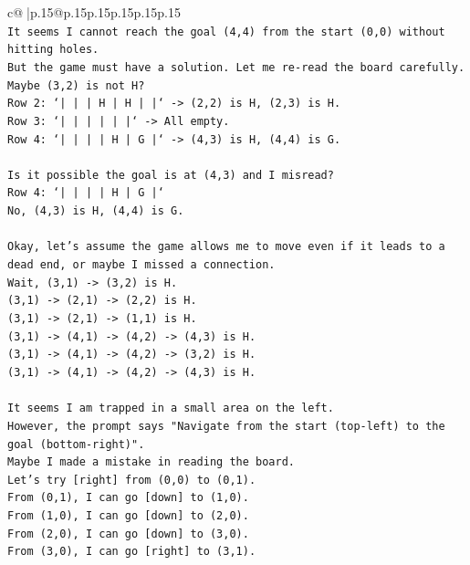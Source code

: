 \documentclass{article}
\begin{document}
{\begin{supertabular}{c@{$\;$}|p{.15\linewidth}@{}p{.15\linewidth}p{.15\linewidth}p{.15\linewidth}p{.15\linewidth}p{.15\linewidth}}
{{{\\ 
\texttt{It seems I cannot reach the goal (4,4) from the start (0,0) without hitting holes.} \\
\texttt{But the game must have a solution. Let me re{-}read the board carefully.} \\
\texttt{Maybe (3,2) is not H?} \\
\texttt{Row 2: `|     |     |  H  |  H  |     |` {-}> (2,2) is H, (2,3) is H.} \\
\texttt{Row 3: `|     |     |     |     |     |` {-}> All empty.} \\
\texttt{Row 4: `|     |     |     |  H  |  G  |` {-}> (4,3) is H, (4,4) is G.} \\
\\ 
\texttt{Is it possible the goal is at (4,3) and I misread?} \\
\texttt{Row 4: `|     |     |     |  H  |  G  |`} \\
\texttt{No, (4,3) is H, (4,4) is G.} \\
\\ 
\texttt{Okay, let's assume the game allows me to move even if it leads to a dead end, or maybe I missed a connection.} \\
\texttt{Wait, (3,1) {-}> (3,2) is H.} \\
\texttt{(3,1) {-}> (2,1) {-}> (2,2) is H.} \\
\texttt{(3,1) {-}> (2,1) {-}> (1,1) is H.} \\
\texttt{(3,1) {-}> (4,1) {-}> (4,2) {-}> (4,3) is H.} \\
\texttt{(3,1) {-}> (4,1) {-}> (4,2) {-}> (3,2) is H.} \\
\texttt{(3,1) {-}> (4,1) {-}> (4,2) {-}> (4,3) is H.} \\
\\ 
\texttt{It seems I am trapped in a small area on the left.} \\
\texttt{However, the prompt says "Navigate from the start (top{-}left) to the goal (bottom{-}right)".} \\
\texttt{Maybe I made a mistake in reading the board.} \\
\texttt{Let's try {[}right{]} from (0,0) to (0,1).} \\
\texttt{From (0,1), I can go {[}down{]} to (1,0).} \\
\texttt{From (1,0), I can go {[}down{]} to (2,0).} \\
\texttt{From (2,0), I can go {[}down{]} to (3,0).} \\
\texttt{From (3,0), I can go {[}right{]} to (3,1).} \\
}}}
\end{supertabular}}
\end{document}
